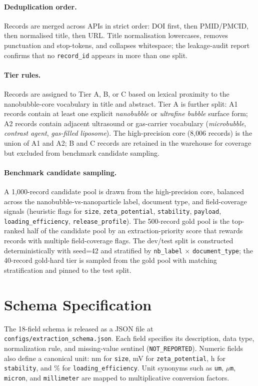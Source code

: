 \documentclass{article}
\newcommand{\NR}{\texttt{NOT\_REPORTED}}
\begin{document}
\paragraph{Deduplication order.}
Records are merged across APIs in strict order: DOI first, then
PMID/PMCID, then normalised title, then URL. Title normalisation
lowercases, removes punctuation and stop-tokens, and collapses
whitespace; the leakage-audit report confirms
that no \texttt{record\_id} appears in more than one split.

\paragraph{Tier rules.}
Records are assigned to Tier A, B, or C based on lexical proximity
to the nanobubble-core vocabulary in title and abstract. Tier A is
further split: A1 records contain at least one explicit
\emph{nanobubble} or \emph{ultrafine bubble} surface form; A2 records
contain adjacent ultrasound or gas-carrier vocabulary
(\emph{microbubble}, \emph{contrast agent}, \emph{gas-filled
liposome}). The high-precision core (8{,}006 records) is the union
of A1 and A2; B and C records are retained in the warehouse for
coverage but excluded from benchmark candidate sampling.

\paragraph{Benchmark candidate sampling.}
A 1{,}000-record candidate pool is drawn from the high-precision
core, balanced across the nanobubble-vs-nanoparticle label, document
type, and field-coverage signals (heuristic flags for
\texttt{size}, \texttt{zeta\_potential}, \texttt{stability},
\texttt{payload}, \texttt{loading\_efficiency},
\texttt{release\_profile}). The 500-record gold pool is the
top-ranked half of the candidate pool by an
extraction-priority score that rewards records with multiple
field-coverage flags. The dev/test split is constructed
deterministically with seed=42 and stratified by
\texttt{nb\_label} $\times$ \texttt{document\_type}; the 40-record
gold-hard tier is sampled from the gold pool with matching
stratification and pinned to the test split.

\section{Schema Specification}
\label{app:schema}

The 18-field schema is released as a JSON file at
\texttt{configs/extraction\_schema.json}. Each field specifies its
description, data type, normalization rule, and missing-value sentinel
(\NR{}). Numeric fields also define a canonical unit: nm for
\texttt{size}, mV for \texttt{zeta\_potential}, h for
\texttt{stability}, and \% for \texttt{loading\_efficiency}. Unit
synonyms such as \texttt{um}, \texttt{$\mu$m}, \texttt{micron}, and
\texttt{millimeter} are mapped to multiplicative conversion factors.
\end{document}
